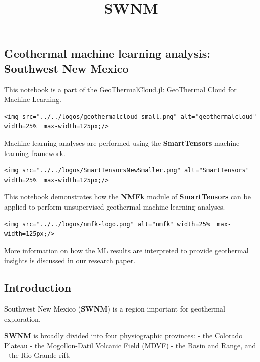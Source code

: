 \documentclass[11pt]{article}
\title{SWNM}
\begin{document}
    \maketitle




    \hypertarget{geothermal-machine-learning-analysis-southwest-new-mexico}{%
\subsection{Geothermal machine learning analysis: Southwest New
Mexico}\label{geothermal-machine-learning-analysis-southwest-new-mexico}}

This notebook is a part of the GeoThermalCloud.jl: GeoThermal Cloud for Machine
Learning.

\begin{verbatim}
<img src="../../logos/geothermalcloud-small.png" alt="geothermalcloud" width=25%  max-width=125px;/>
\end{verbatim}

Machine learning analyses are performed using the \textbf{SmartTensors}
machine learning framework.

\begin{verbatim}
<img src="../../logos/SmartTensorsNewSmaller.png" alt="SmartTensors" width=25%  max-width=125px;/>
\end{verbatim}

This notebook demonstrates how the \textbf{NMFk} module of
\textbf{SmartTensors} can be applied to perform unsupervised geothermal
machine-learning analyses.

\begin{verbatim}
<img src="../../logos/nmfk-logo.png" alt="nmfk" width=25%  max-width=125px;/>
\end{verbatim}

More information on how the ML results are interpreted to provide
geothermal insights is discussed in our research paper.

    \hypertarget{introduction}{%
\subsection{Introduction}\label{introduction}}

Southwest New Mexico (\textbf{SWNM}) is a region important for
geothermal exploration.

\textbf{SWNM} is broadly divided into four physiographic provinces: -
the Colorado Plateau - the Mogollon-Datil Volcanic Field (MDVF) - the
Basin and Range, and - the Rio Grande rift.
\end{document}
